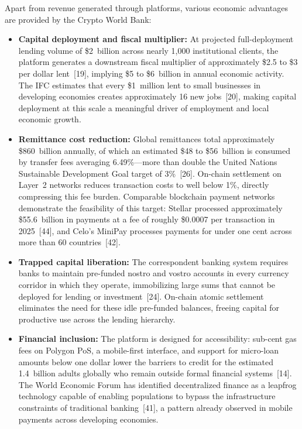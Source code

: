 \documentclass[12pt,a4paper]{report}
\begin{document}
Apart from revenue generated through platforms, various economic advantages are provided by the Crypto World Bank:

\begin{itemize}[noitemsep]
\item \textbf{Capital deployment and fiscal multiplier:} At projected full-deployment lending volume of \$2~billion across nearly 1,000 institutional clients, the platform generates a downstream fiscal multiplier of approximately \$2.5 to \$3 per dollar lent~[19], implying \$5 to \$6~billion in annual economic activity. The IFC estimates that every \$1~million lent to small businesses in developing economies creates approximately 16 new jobs~[20], making capital deployment at this scale a meaningful driver of employment and local economic growth.

\item \textbf{Remittance cost reduction:} Global remittances total approximately \$860~billion annually, of which an estimated \$48 to \$56~billion is consumed by transfer fees averaging 6.49\%---more than double the United Nations Sustainable Development Goal target of 3\%~[26]. On-chain settlement on Layer~2 networks reduces transaction costs to well below 1\%, directly compressing this fee burden. Comparable blockchain payment networks demonstrate the feasibility of this target: Stellar processed approximately \$55.6~billion in payments at a fee of roughly \$0.0007 per transaction in 2025~[44], and Celo's MiniPay processes payments for under one cent across more than 60 countries~[42].

\item \textbf{Trapped capital liberation:} The correspondent banking system requires banks to maintain pre-funded nostro and vostro accounts in every currency corridor in which they operate, immobilizing large sums that cannot be deployed for lending or investment~[24]. On-chain atomic settlement eliminates the need for these idle pre-funded balances, freeing capital for productive use across the lending hierarchy.

\item \textbf{Financial inclusion:} The platform is designed for accessibility: sub-cent gas fees on Polygon PoS, a mobile-first interface, and support for micro-loan amounts below one dollar lower the barriers to credit for the estimated 1.4~billion adults globally who remain outside formal financial systems~[14]. The World Economic Forum has identified decentralized finance as a leapfrog technology capable of enabling populations to bypass the infrastructure constraints of traditional banking~[41], a pattern already observed in mobile payments across developing economies.


\end{itemize}
\end{document}
